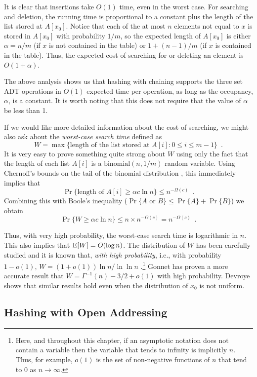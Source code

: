 It is clear that insertions take $O(1)$ time, even in the worst case.
For searching and deletion, the running time is proportional to a
constant plus the length of the list stored at $A[x_0]$.  Notice that
each of the at most $n$ elements not equal to $x$ is stored in
$A[x_0]$ with probability $1/m$, so the expected length of $A[x_0]$ is
either $\alpha=n/m$ (if $x$ is not contained in the table) or
$1+(n-1)/m$ (if $x$ is contained in the table). Thus, the expected
cost of searching for or deleting an element is $O(1+\alpha)$.

The above analysis shows us that hashing with chaining supports the
three set ADT operations in $O(1)$ expected time per operation, as
long as the occupancy, $\alpha$, is a constant. It is worth noting
that this does not require that the value of $\alpha$ be less than 1. 

If we would like more detailed information about the cost of searching, we
might also ask about the \emph{worst-case search time} defined as
\[
   W = \max\{\mbox{length of the list stored at $A[i]$} : 0\le i\le m-1 \} 
	\enspace .
\]
It is very easy to prove something quite strong about $W$ using only
the fact that the length of each list $A[i]$ is a
$\mathrm{binomial}(n,1/m)$ random variable.  Using Chernoff's bounds
on the tail of the binomial distribution \cite{c52}, this
immediately implies that   
\[
   \Pr\{\mbox{length of $A[i]$} \ge \alpha c\ln n\} \le n^{-\Omega(c)} \enspace .
\]
Combining this with Boole's inequality ($\Pr\{\mbox{$A$ or $B$}\} \le
\Pr\{A\}+\Pr\{B\}$) we obtain
\[
   \Pr\{W \ge \alpha c\ln n\} \le n\times n^{-\Omega(c)} = n^{-\Omega(c)} \enspace .
\]

Thus, with very high probability, the worst-case search time is
logarithmic in $n$.  This also implies that $\mathrm{E}[W]=O(\log n)$.  The
distribution of $W$ has been carefully studied and it is known that,
\emph{with high probability}, i.e., with
probability $1-o(1)$, $W=(1+o(1))\ln n/\ln\ln n$
\cite{jk77,ksc78}.\footnote{Here, and throughout this chapter, if an
asymptotic notation does not contain a variable then the variable that
tends to infinity is implicitly $n$.  Thus, for example, $o(1)$ is the
set of non-negative functions of $n$ that tend to 0 as
$n\rightarrow\infty$.} Gonnet has proven a more accurate result that
$W=\Gamma^{-1}(n) -3/2 + o(1)$ with high probability. Devroye
\cite{d85} shows that similar results hold even when the distribution
of $x_0$ is not uniform.

\subsection{Hashing with Open Addressing}

